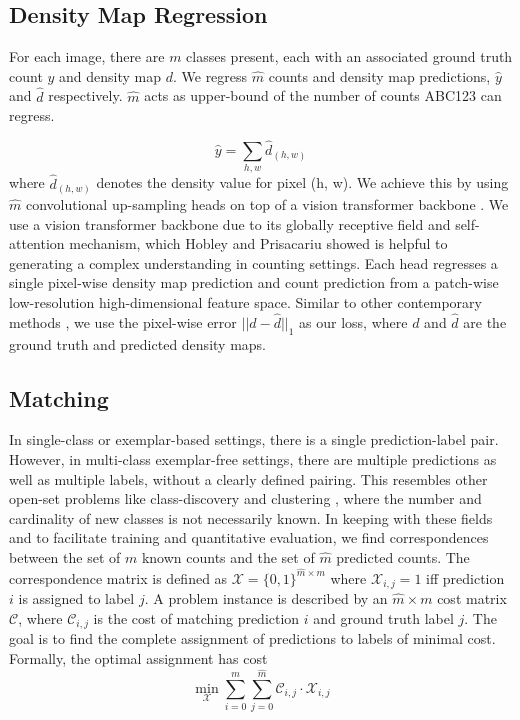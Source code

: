 \documentclass[runningheads]{llncs}
\begin{document}
\subsection{Density Map Regression}
For each image, there are $m$ classes present, each with an associated ground truth count $y$ and density map $d$. We regress $\hat{m}$ counts and density map predictions, $\hat{y}$ and $\hat{d}$ respectively. $\hat{m}$ acts as upper-bound of the number of counts ABC123 can regress.

\begin{equation}
    \hat{y} = \sum_{h,w}{\hat{d}_{(h,w)}}
\end{equation} 
where $\hat{d}_{(h,w)}$ denotes the density value for pixel (h, w).
We achieve this by using $\hat{m}$ convolutional up-sampling heads on top of a vision transformer backbone \cite{dosovitskiy2020vit}. 
We use a vision transformer backbone due to its globally receptive field and self-attention mechanism, which Hobley and Prisacariu \cite{hobley2023LTCA} showed is helpful to generating a complex understanding in counting settings.
Each head regresses a single pixel-wise density map prediction and count prediction from a patch-wise low-resolution high-dimensional feature space.
Similar to other contemporary methods \cite{ranjan2021Famnet, liu2022countr, yang2021cfoc, lin2021object}, we use the pixel-wise error $||d - \hat{d}||_1$ as our loss, where $d$ and $\hat{d}$ are the ground truth and predicted density maps.

\subsection{Matching}
In single-class or exemplar-based settings, there is a single prediction-label pair. 
However, in multi-class exemplar-free settings, there are multiple predictions as well as multiple labels, without a clearly defined pairing.
This resembles other open-set problems like class-discovery \cite{troisemaine2023novel, 5454426} and clustering \cite{hobley2023dms,pmlr-v48-xieb16}, where the number and cardinality of new classes is not necessarily known. 
In keeping with these fields and to facilitate training and quantitative evaluation, we find correspondences between the set of $m$ known counts and the set of $\hat{m}$ predicted counts. 
The correspondence matrix is defined as $\mathcal{X} = \{0,1\}^{\hat{m}\times m}$ where  $\mathcal{X}_{i,j}=1$ iff prediction $i$ is assigned to label $j$.
A problem instance is described by an $\hat{m}\times m$ cost matrix $\mathcal{C}$, where $\mathcal{C}_{i,j}$ is the cost of matching prediction $i$ and ground truth label $j$. The goal is to find the complete assignment of predictions to labels of minimal cost.
Formally, the optimal assignment has cost
\begin{equation}\label{eq:Bipartite_matching}  \min_{\mathcal{X}}\sum_{i=0}^{m}\sum_{j=0}^{\hat{m}}\mathcal{C}_{i,j} \cdot \mathcal{X}_{i,j}
\end{equation}
\end{document}
